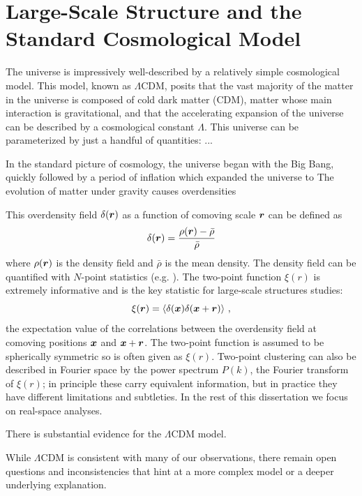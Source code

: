 \graphicspath{{figures/figures_intro/}}


\section{Large-Scale Structure and the Standard Cosmological Model}

The universe is impressively well-described by a relatively simple cosmological model.
This model, known as $\Lambda$CDM, posits that the vast majority of the matter in the universe is composed of cold dark matter (CDM), matter whose main interaction is gravitational, and that the accelerating expansion of the universe can be described by a cosmological constant $\Lambda$.
This universe can be parameterized by just a handful of quantities: ... 

In the standard picture of cosmology, the universe began with the Big Bang, quickly followed by a period of inflation which expanded the universe to 
The evolution of matter under gravity causes overdensities 


This overdensity field $\delta(\bm{r})$ as a function of comoving scale $\bm{r}$ can be defined as
\begin{equation}
    \delta(\bm{r}) = \frac{\rho(\bm{r}) - \bar{\rho}}{\bar{\rho}}
\end{equation}
where $\rho(\bm{r})$ is the density field and $\bar{\rho}$ is the mean density.
The density field can be quantified with $N$-point statistics (e.g. \citealt{peebles_large-scale_1980}).
The two-point function $\xi(r)$ is extremely informative and is the key statistic for large-scale structures studies:
\begin{equation}
    \label{eq:xi}
    \xi(\bm{r}) = \langle \delta(\bm{x}) \delta(\bm{x} + \bm{r}) \rangle ~,
\end{equation}
the expectation value of the correlations between the overdensity field at comoving positions $\bm{x}$ and $\bm{x}+\bm{r}$.
The two-point function is assumed to be spherically symmetric so is often given as $\xi(r)$.
Two-point clustering can also be described in Fourier space by the power spectrum $P(k)$, the Fourier transform of $\xi(r)$; in principle these carry equivalent information, but in practice they have different limitations and subtleties.
In the rest of this dissertation we focus on real-space analyses.

There is substantial evidence for the $\Lambda$CDM model.


While $\Lambda$CDM is consistent with many of our observations, there remain open questions and inconsistencies that hint at a more complex model or a deeper underlying explanation.



